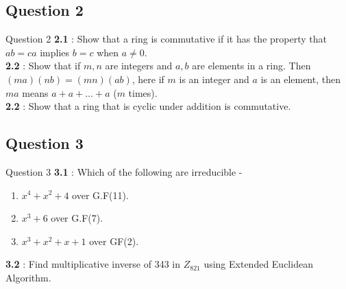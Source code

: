 \documentclass[xcolor=svgnames]{beamer}
\begin{document}
\subsection{Question 2}
\begin{frame}{Question 2}
    \textbf{2.1} : Show that a ring is commutative if it has the property that $ab=ca$ implies $b=c$ when $a \neq 0$.
    \\ \textbf{2.2} : Show that if $m, n$ are integers and $a, b$ are elements in a ring.  Then $(ma)(nb) = (mn)(ab)$, here  if $m$ is an integer and $a$ is an element, then $ma$ means $a + a + \ldots + a$ ($m$ times).
    \\ \textbf{2.2} : Show that a ring that is cyclic under addition is commutative.
\end{frame}
\subsection{Question 3}
\begin{frame}{Question 3}
    \textbf{3.1} : Which of the following are irreducible - 
    \begin{enumerate}
        \item $x^4 + x^2 + 4$ over G.F(11).
        \item $x^3 + 6$ over G.F(7).
        \item $x^3 + x^2 + x + 1$ over GF(2).
    \end{enumerate}
    \textbf{3.2} : Find multiplicative inverse of 343 in $Z_{821}$ using Extended Euclidean Algorithm.
\end{frame}
\end{document}
